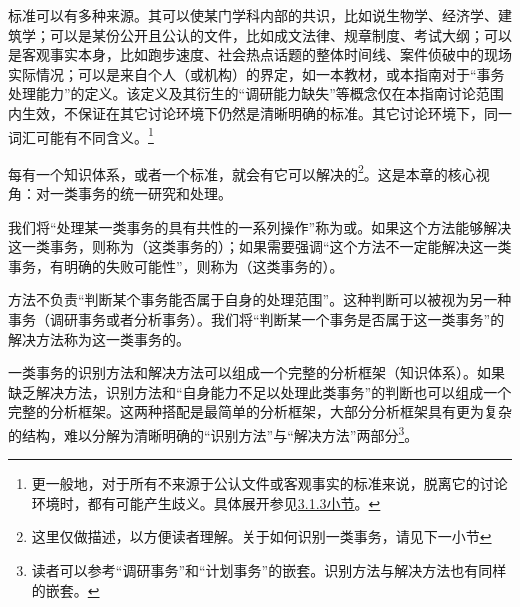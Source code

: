 \begin{examples}
标准可以有多种来源。其可以使某门学科内部的共识，比如说生物学、经济学、建筑学；可以是某份公开且公认的文件，比如成文法律、规章制度、考试大纲；可以是客观事实本身，比如跑步速度、社会热点话题的整体时间线、案件侦破中的现场实际情况；可以是来自个人（或机构）的界定，如一本教材，或本指南对于“事务处理能力”的定义。该定义及其衍生的“调研能力缺失”等概念仅在本指南讨论范围内生效，不保证在其它讨论环境下仍然是清晰明确的标准。其它讨论环境下，同一词汇可能有不同含义。\footnote{更一般地，对于所有不来源于公认文件或客观事实的标准来说，脱离它的讨论环境时，都有可能产生歧义。具体展开参见\hyperref[sec:能力边界]{3.1.3小节}。}
\end{examples}
每有一个知识体系，或者一个标准，就会有它可以解决的\footnote{这里仅做描述，以方便读者理解。关于如何识别一类事务，请见下一小节}。这是本章的核心视角：对一类事务的统一研究和处理。

我们将“处理某一类事务的具有共性的一系列操作”称为或。如果这个方法能够解决这一类事务，则称为（这类事务的）；如果需要强调“这个方法不一定能解决这一类事务，有明确的失败可能性”，则称为（这类事务的）。

方法不负责“判断某个事务能否属于自身的处理范围”。这种判断可以被视为另一种事务（调研事务或者分析事务）。我们将“判断某一个事务是否属于这一类事务”的解决方法称为这一类事务的。

\begin{explain}
一类事务的识别方法和解决方法可以组成一个完整的分析框架（知识体系）。如果缺乏解决方法，识别方法和“自身能力不足以处理此类事务”的判断也可以组成一个完整的分析框架。这两种搭配是最简单的分析框架，大部分分析框架具有更为复杂的结构，难以分解为清晰明确的“识别方法”与“解决方法”两部分\footnote{读者可以参考“调研事务”和“计划事务”的嵌套。识别方法与解决方法也有同样的嵌套。}。
\end{explain}


